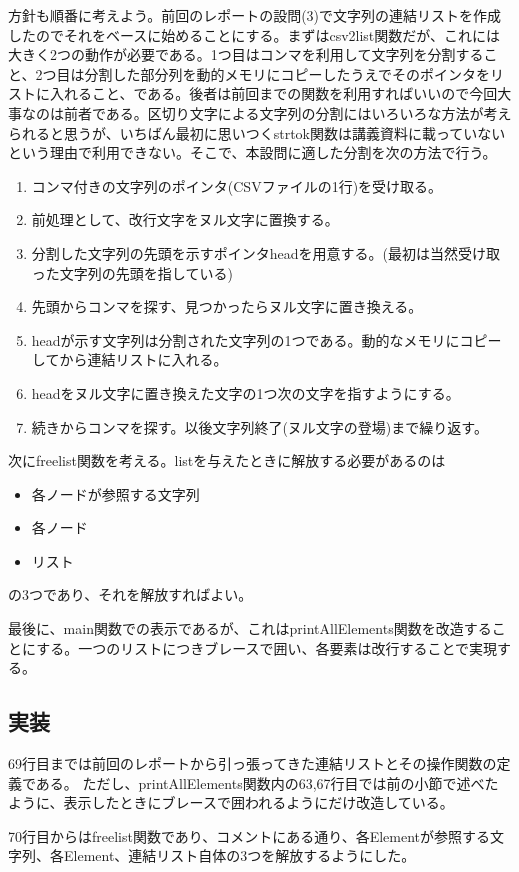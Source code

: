 \documentclass[dvipdfmx,12pt,a4j]{jarticle}
\begin{document}
方針も順番に考えよう。前回のレポートの設問(3)で文字列の連結リストを作成したのでそれをベースに始めることにする。まずはcsv2list関数だが、これには大きく2つの動作が必要である。1つ目はコンマを利用して文字列を分割すること、2つ目は分割した部分列を動的メモリにコピーしたうえでそのポインタをリストに入れること、である。後者は前回までの関数を利用すればいいので今回大事なのは前者である。区切り文字による文字列の分割にはいろいろな方法が考えられると思うが、いちばん最初に思いつくstrtok関数は講義資料に載っていないという理由で利用できない。そこで、本設問に適した分割を次の方法で行う。
\begin{enumerate}
  \item コンマ付きの文字列のポインタ(CSVファイルの1行)を受け取る。
  \item 前処理として、改行文字をヌル文字に置換する。
  \item 分割した文字列の先頭を示すポインタheadを用意する。(最初は当然受け取った文字列の先頭を指している)
  \item 先頭からコンマを探す、見つかったらヌル文字に置き換える。
  \item headが示す文字列は分割された文字列の1つである。動的なメモリにコピーしてから連結リストに入れる。
  \item headをヌル文字に置き換えた文字の1つ次の文字を指すようにする。
  \item 続きからコンマを探す。以後文字列終了(ヌル文字の登場)まで繰り返す。
\end{enumerate}
次にfreelist関数を考える。listを与えたときに解放する必要があるのは
\begin{itemize}
  \item 各ノードが参照する文字列
  \item 各ノード
  \item リスト
\end{itemize}
の3つであり、それを解放すればよい。

最後に、main関数での表示であるが、これはprintAllElements関数を改造することにする。一つのリストにつきブレースで囲い、各要素は改行することで実現する。

\subsection{実装}
69行目までは前回のレポートから引っ張ってきた連結リストとその操作関数の定義である。
ただし、printAllElements関数内の63,67行目では前の小節で述べたように、表示したときにブレースで囲われるようにだけ改造している。

70行目からはfreelist関数であり、コメントにある通り、各Elementが参照する文字列、各Element、連結リスト自体の3つを解放するようにした。
\end{document}
